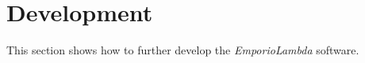 \section{Development}
This section shows how to further develop the \textit{EmporioLambda} software.





